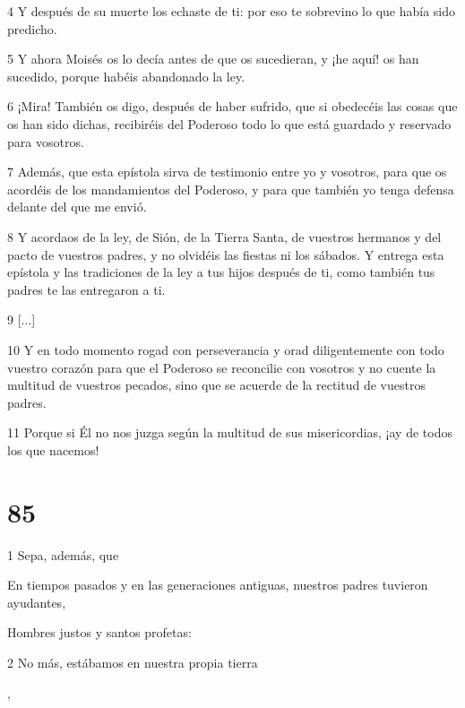 \par 4 Y después de su muerte los echaste de ti: por eso te sobrevino lo que había sido predicho.

\par 5 Y ahora Moisés os lo decía antes de que os sucedieran, y ¡he aquí! os han sucedido, porque habéis abandonado la ley.

\par 6 ¡Mira! También os digo, después de haber sufrido, que si obedecéis las cosas que os han sido dichas, recibiréis del Poderoso todo lo que está guardado y reservado para vosotros.

\par 7 Además, que esta epístola sirva de testimonio entre yo y vosotros, para que os acordéis de los mandamientos del Poderoso, y para que también yo tenga defensa delante del que me envió.

\par 8 Y acordaos de la ley, de Sión, de la Tierra Santa, de vuestros hermanos y del pacto de vuestros padres, y no olvidéis las fiestas ni los sábados. Y entrega esta epístola y las tradiciones de la ley a tus hijos después de ti, como también tus padres te las entregaron a ti.

\par 9 [...]

\par 10 Y en todo momento rogad con perseverancia y orad diligentemente con todo vuestro corazón para que el Poderoso se reconcilie con vosotros y no cuente la multitud de vuestros pecados, sino que se acuerde de la rectitud de vuestros padres.

\par 11 Porque si Él no nos juzga según la multitud de sus misericordias, ¡ay de todos los que nacemos!

\chapter{85}

\par 1 Sepa, además, que

\par En tiempos pasados ​​y en las generaciones antiguas, nuestros padres tuvieron ayudantes,

\par Hombres justos y santos profetas:

\par 2 No más, estábamos en nuestra propia tierra

\par [Y nos ayudaron cuando pecamos],

